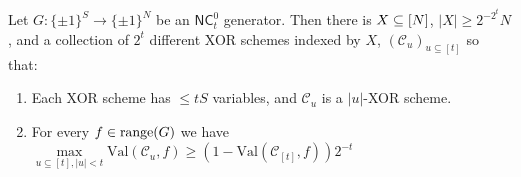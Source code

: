 \begin{theorem}\label{cellprobe:thm:fourier}
Let $G: \{\pm 1\}^S \to \{\pm 1\}^N$ be an $\mathsf{NC}^0_t$ generator. Then there is $X \subseteq [N]$, $|X| \geq 2^{-2^t}N$, and a collection of $2^{t}$ different XOR schemes indexed by $X$, $(\mathcal{C}_{u})_{ u \subseteq [t]}$ so that:
\begin{enumerate}
    \item Each XOR scheme has $\leq tS$ variables, and $\mathcal{C}_u$ is a $|u|$-XOR scheme.
    \item For every $f \in \mathrm{range}(G)$ 
    we have
    $   \max\limits_{u \subseteq [t], |u| < t} \mathrm{Val}(\mathcal{C}_u,f) \geq (1- \mathrm{Val}(\mathcal{C}_{[t]},f))2^{-t}$
\end{enumerate}
\end{theorem}
